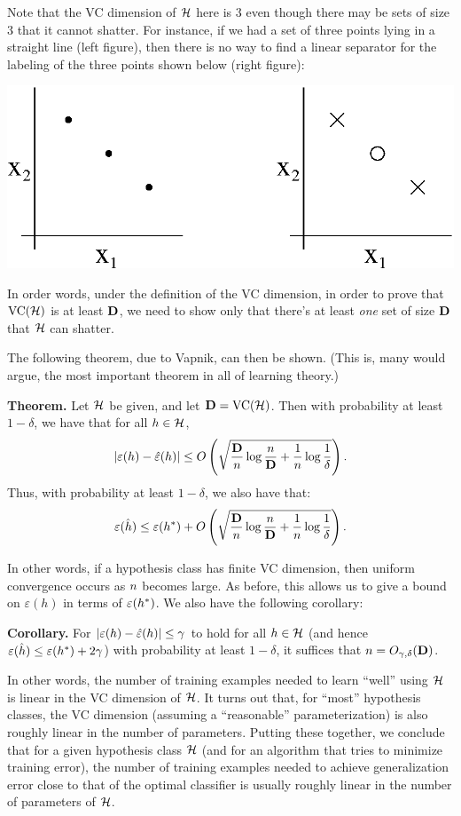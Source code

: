 \documentclass{article} %
\begin{document}
Note that the VC dimension of ${\cal H}$ here is 3 even though there may be sets of
size 3 that it cannot shatter.  For instance, if we had a set of three points
lying in a straight line (left figure), then there is no way to find a
linear separator for the labeling of the three points shown below (right figure):
\begin{center}
\includegraphics[scale=0.5]{collinear-notshatter.eps}
\end{center}

In order words, under the definition of the VC dimension, in order to prove that
${\rm VC}({\cal H})$ is at least ${\textbf{D}}$, we need to show only
that there's at least \emph{one} set of size ${\textbf{D}}$ that ${\cal H}$ can shatter.

The following theorem, due to Vapnik, can then be shown.  (This is, many would argue,
the most important theorem in all of learning theory.)

\noindent
{\bf Theorem.}
Let ${\cal H}$ be given, and let ${\textbf{D}} = {\rm VC}({\cal H})$.  Then with probability at least $1-\delta$, we
have that for all $h \in {\cal H}$,
\[
|\varepsilon(h) - \hat\varepsilon(h)| \leq O\left(\sqrt{\frac{{\textbf{D}}}{{n}}\log\frac{{n}}{{\textbf{D}}} + \frac{1}{{n}}\log\frac{1}{\delta}}\right).
\]
Thus, with probability at least $1-\delta$, we also have that:
\[
\varepsilon(\hat{h}) \leq \varepsilon(h^\ast) + O\left(\sqrt{\frac{{\textbf{D}}}{{n}}\log\frac{{n}}{{\textbf{D}}} + \frac{1}{{n}}\log\frac{1}{\delta}}\right).
\]

In other words, if a hypothesis class has finite VC dimension,
then uniform convergence occurs as ${n}$ becomes large.
As before,
this allows us to give a bound on $\varepsilon(h)$ in terms
of $\varepsilon(h^\ast)$.  We also
have the following corollary:

\medskip
\noindent
{\bf Corollary.}  For $|\varepsilon(h) - \hat\varepsilon(h)| \leq \gamma$ to hold for all $h \in {\cal H}$
(and hence $\varepsilon(\hat{h}) \leq \varepsilon(h^\ast) + 2\gamma$) with probability at least $1-\delta$,
it suffices that ${n} = O_{\gamma,\delta}({\textbf{D}})$.
\medskip

In other words, the number of training examples needed to learn ``well'' using ${\cal H}$ is linear
in the VC dimension of ${\cal H}$.  It turns out that, for ``most'' hypothesis classes, the VC dimension
(assuming a ``reasonable'' parameterization) is also roughly linear in the number of parameters.
Putting these together, we conclude that for a given hypothesis class ${\cal H}$ (and for an algorithm that
tries to minimize training error), the number of training
examples needed to achieve generalization error close to that of the optimal classifier is usually roughly linear in the number of parameters of ${\cal H}$.
\end{document}
